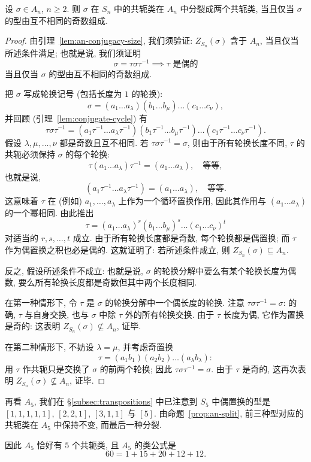 \begin{proposition}
\label{prop:an-split}
设 $\sigma \in A_n$, $n \geq 2$. 则 $\sigma$ 在 $S_n$ 中的共轭类在 $A_n$ 中分裂成两个共轭类, 当且仅当 $\sigma$ 的型由互不相同的奇数组成.
\end{proposition}

\begin{proof}
由引理~\ref{lem:an-conjugacy-size}, 我们须验证: $Z_{S_n}(\sigma)$ 含于 $A_n$, 当且仅当所述条件满足; 也就是说, 我们须证明
\[
\sigma = \tau\sigma\tau^{-1} \implies \tau\text{ 是偶的}
\]
当且仅当 $\sigma$ 的型由互不相同的奇数组成.

把 $\sigma$ 写成轮换记号 (包括长度为 $1$ 的轮换):
\[
\sigma = (a_1 \dots a_\lambda)(b_1 \dots b_\mu)\dots(c_1 \dots c_\nu),
\]
并回顾 (引理~\ref{lem:conjugate-cycle}) 有
\[
\tau\sigma\tau^{-1} = (a_1\tau^{-1} \dots a_\lambda\tau^{-1})(b_1\tau^{-1} \dots b_\mu\tau^{-1})\dots(c_1\tau^{-1} \dots c_\nu\tau^{-1}).
\]
假设 $\lambda,\mu,\dots,\nu$ 都是奇数且互不相同. 若 $\tau\sigma\tau^{-1} = \sigma$, 则由于所有轮换长度不同, $\tau$ 的共轭必须保持 $\sigma$ 的每个轮换:
\[
\tau(a_1 \dots a_\lambda)\tau^{-1} = (a_1 \dots a_\lambda),\quad\text{等等},
\]
也就是说,
\[
(a_1\tau^{-1} \dots a_\lambda\tau^{-1}) = (a_1 \dots a_\lambda),\quad\text{等等}.
\]
这意味着 $\tau$ 在 (例如) $a_1,\dots,a_\lambda$ 上作为一个循环置换作用, 因此其作用与 $(a_1 \dots a_\lambda)$ 的一个幂相同. 由此推出
\[
\tau = (a_1 \dots a_\lambda)^r(b_1 \dots b_\mu)^s\dots(c_1 \dots c_\nu)^t
\]
对适当的 $r,s,\dots,t$ 成立. 由于所有轮换长度都是奇数, 每个轮换都是偶置换; 而 $\tau$ 作为偶置换之积也必是偶的. 这就证明了: 若所述条件成立, 则 $Z_{S_n}(\sigma) \subseteq A_n$.

反之, 假设所述条件不成立: 也就是说, $\sigma$ 的轮换分解中要么有某个轮换长度为偶数, 要么所有轮换长度都是奇数但其中两个长度相同.

在第一种情形下, 令 $\tau$ 是 $\sigma$ 的轮换分解中一个偶长度的轮换. 注意 $\tau\sigma\tau^{-1} = \sigma$: 的确, $\tau$ 与自身交换, 也与 $\sigma$ 中除 $\tau$ 外的所有轮换交换. 由于 $\tau$ 长度为偶, 它作为置换是奇的: 这表明 $Z_{S_n}(\sigma) \not\subseteq A_n$, 证毕.

在第二种情形下, 不妨设 $\lambda = \mu$, 并考虑奇置换
\[
\tau = (a_1 b_1)(a_2 b_2)\dots(a_\lambda b_\lambda):
\]
用 $\tau$ 作共轭只是交换了 $\sigma$ 的前两个轮换; 因此 $\tau\sigma\tau^{-1} = \sigma$. 由于 $\tau$ 是奇的, 这再次表明 $Z_{S_n}(\sigma) \not\subseteq A_n$, 证毕.
\end{proof}

\begin{example}
\label{ex:a5-conjugacy}
再看 $A_5$, 我们在 \S\ref{subsec:transpositions} 中已注意到 $S_5$ 中偶置换的型是 $[1,1,1,1,1]$, $[2,2,1]$, $[3,1,1]$ 与 $[5]$. 由命题~\ref{prop:an-split}, 前三种型对应的共轭类在 $A_5$ 中保持不变, 而最后一种分裂.

因此 $A_5$ 恰好有 $5$ 个共轭类, 且 $A_5$ 的类公式是
\[
60 = 1 + 15 + 20 + 12 + 12.
\]
\end{example}

